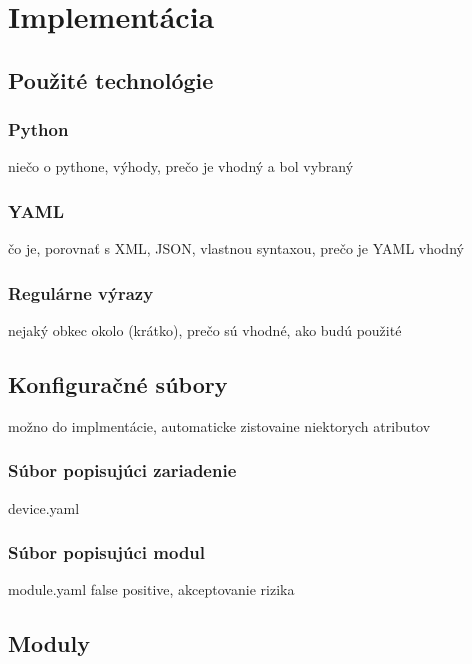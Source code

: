 \chapter{Implementácia}

\section{Použité technológie}
 \subsection{Python}
 niečo o pythone, výhody, prečo je vhodný a bol vybraný
 \subsection{YAML}
 čo je, porovnať s XML, JSON, vlastnou syntaxou, prečo je YAML vhodný
 \subsection{Regulárne výrazy}
 nejaký obkec okolo (krátko), prečo sú vhodné, ako budú použité

\section{Konfiguračné súbory}
možno do implmentácie, automaticke zistovaine niektorych atributov
\subsection{Súbor popisujúci zariadenie}
device.yaml
\subsection{Súbor popisujúci modul}
module.yaml
false positive, akceptovanie rizika

\section{Moduly}



